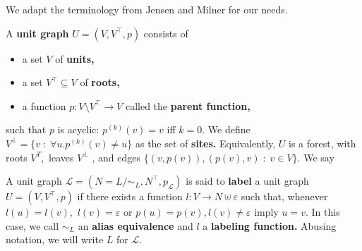  We adapt the terminology from Jensen and Milner \citep{jensen-milner-bigraphs} for our needs.


\begin{definition}
  A \textbf{unit graph} $U = (V, V^{\top}, p)$ consists of
  \begin{itemize}
    \item a set $V$ of \textbf{units,}
    \item a set $V^{\top} \subseteq V$ of \textbf{roots,}
    \item a function $p: V \setminus V^{\top} \to V$ called the \textbf{parent function,}
  \end{itemize}
  such that $p$ is acyclic: $p^{(k)}(v) = v$ iff $k = 0$. We define $V^{\bot} = \{v \;:\; \forall u. p^{(k)}(v) \neq u \}$ as the set of \textbf{sites.} Equivalently, $U$ is a forest, with roots $V^{T},$ leaves $V^{\bot}$ , and edges $\{(v, p(v)), (p(v), v) \;:\; v \in V\}.$ We say

  A unit graph $\mathcal{L} = (N = L / \sim_{L}, N^{\top}, p_{\mathcal{L}})$ is said to \textbf{label} a unit graph $U = (V, V^{\top}, p)$
  if there exists a function $l: V \to N \uplus \varepsilon$ such that, whenever $l(u) = l(v),$ $l(v) = \varepsilon$ or $p(u) = p(v), l(v) \neq \varepsilon$ imply $u = v.$ In this case, we call $\sim_{L}$ an \textbf{alias equivalence} and $l$ a \textbf{labeling function.} Abusing notation, we will write $L$ for $\mathcal{L}.$
\end{definition}

